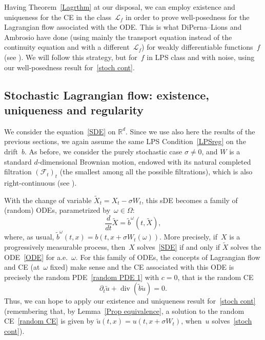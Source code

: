 \documentclass[a4paper,10pt]{article}
\newcommand\1{\mathbbm{1}}
\newcommand{\mc}{\mathcal}
\newcommand{\td}{\tilde}
\DeclareMathOperator{\diverg}{div}
\numberwithin{equation}{section}
\begin{document}
Having Theorem~\ref{Lagrthm} at our disposal, we can employ existence and uniqueness for the CE in the class~$\mc{L}_f$ in order to prove well-posedness for the Lagrangian flow associated with the ODE. This is what DiPerna--Lions and Ambrosio have done (using mainly the transport equation instead of the continuity equation and with a different~$\mc{L}_f$) for weakly differentiable functions~$f$ (see \cite{DIPELI89,AMBROSIO04}). We will follow this strategy, but for~$f$ in LPS class and with noise, using our well-posedness result for~\eqref{stoch cont}. 

\subsection{Stochastic Lagrangian flow: existence, uniqueness and regularity}

We consider the equation~\eqref{SDE} on $\mathbb{R}^d$. Since we use also here the results of the previous sections, we again assume the same LPS Condition~\ref{LPSreg} on the drift~$b$. As before, we consider the purely stochastic case $\sigma\neq0$, and $W$ is a standard $d$-dimensional Brownian motion, endowed with its natural completed filtration $(\mc{F}_t)_t$ (the smallest among all the possible filtrations), which is also right-continuous (see \cite[Proposition 2.5]{BASS11}).

With the change of variable $\td{X}_t=X_t-\sigma W_t$, this sDE becomes a family of (random) ODEs, parametrized by~$\omega\in \Omega$:
\begin{equation}
\frac{d}{dt}\td{X} =\td{b}^{\omega}(t,\td{X} ),\label{ODE}
\end{equation}
where, as usual, $\td{b}^\omega(t,x)=b(t,x+\sigma W_t(\omega))$. More precisely, if~$X$ is a progressively measurable process, then~$X$ solves~\eqref{SDE} if and only if $\td{X}$ solves the ODE~\eqref{ODE} for a.e.~$\omega$. For this family of ODEs, the concepts of Lagrangian flow and CE (at~$\omega$ fixed) make sense and the CE associated with this ODE is precisely the random PDE~\eqref{random PDE 1} with $c=0$, that is the random CE
\begin{equation}
\partial_t\td{u}+\diverg(\td{b}\td{u})=0 .\label{random CE}
\end{equation}
Thus, we can hope to apply our existence and uniqueness result for~\eqref{stoch cont} (remembering that, by Lemma~\ref{Prop equivalence}, a solution to the random CE~\eqref{random CE} is given by $\td{u}(t,x)=u(t,x+\sigma W_t)$, when~$u$ solves~\eqref{stoch cont}).
\end{document}
